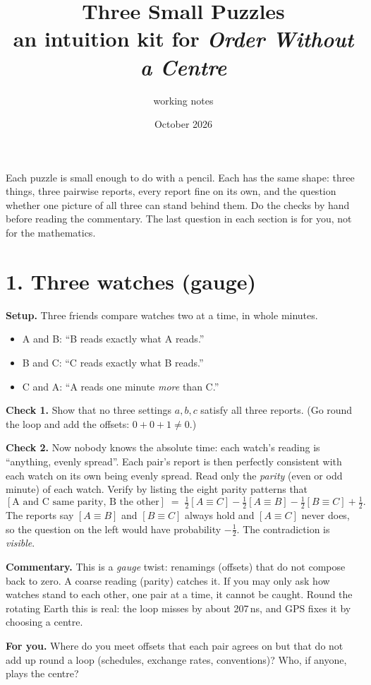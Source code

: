 \documentclass[11pt]{article}
\title{Three Small Puzzles\\\large an intuition kit for \emph{Order Without a Centre}}
\author{working notes}
\date{October 2026}
\begin{document}
\maketitle

\noindent Each puzzle is small enough to do with a pencil. Each has the same
shape: three things, three pairwise reports, every report fine on its own, and the
question whether one picture of all three can stand behind them. Do the checks by
hand before reading the commentary. The last question in each section is for you,
not for the mathematics.

\section*{1. Three watches (gauge)}
\textbf{Setup.} Three friends compare watches two at a time, in whole minutes.
\begin{itemize}[nosep]
  \item A and B: ``B reads exactly what A reads.''
  \item B and C: ``C reads exactly what B reads.''
  \item C and A: ``A reads one minute \emph{more} than C.''
\end{itemize}
\textbf{Check 1.} Show that no three settings $a,b,c$ satisfy all three reports.
(Go round the loop and add the offsets: $0+0+1\neq0$.)

\textbf{Check 2.} Now nobody knows the absolute time: each watch's reading is
``anything, evenly spread''. Each pair's report is then perfectly consistent with
each watch on its own being evenly spread. Read only the \emph{parity} (even or
odd minute) of each watch. Verify by listing the eight parity patterns that
\[
  [\text{A and C same parity, B the other}]
  \;=\; \tfrac12[A{\equiv}C] - \tfrac12[A{\equiv}B] - \tfrac12[B{\equiv}C] + \tfrac12 .
\]
The reports say $[A{\equiv}B]$ and $[B{\equiv}C]$ always hold and $[A{\equiv}C]$ never
does, so the question on the left would have probability $-\tfrac12$. The
contradiction is \emph{visible}.

\textbf{Commentary.} This is a \emph{gauge} twist: renamings (offsets) that do not
compose back to zero. A coarse reading (parity) catches it. If you may only ask
how watches stand to each other, one pair at a time, it cannot be caught.
Round the rotating Earth this is real: the loop misses by about 207\,ns, and GPS
fixes it by choosing a centre.

\textbf{For you.} Where do you meet offsets that each pair agrees on but that do
not add up round a loop (schedules, exchange rates, conventions)? Who, if anyone,
plays the centre?
\end{document}
